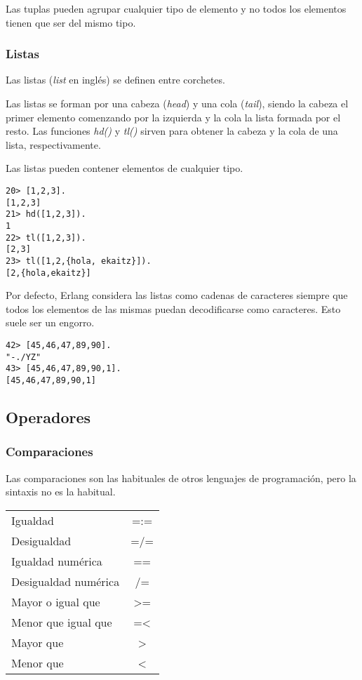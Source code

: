 Las tuplas pueden agrupar cualquier tipo de elemento y no todos los elementos tienen que ser del mismo tipo.

\subsubsection{Listas}

Las listas (\textit{list} en inglés) se definen entre corchetes.

Las listas se forman por una cabeza (\textit{head}) y una cola (\textit{tail}), siendo la cabeza el primer
elemento comenzando por la izquierda y la cola la lista formada por el resto. Las funciones \textit{hd()} y
\textit{tl()} sirven para obtener la cabeza y la cola de una lista, respectivamente.

Las listas pueden contener elementos de cualquier tipo.

\begin{lstlisting}
20> [1,2,3].
[1,2,3]
21> hd([1,2,3]).
1
22> tl([1,2,3]).
[2,3]
23> tl([1,2,{hola, ekaitz}]).
[2,{hola,ekaitz}]
\end{lstlisting}

Por defecto, Erlang considera las listas como cadenas de caracteres siempre que todos los elementos de las
mismas puedan decodificarse como caracteres. Esto suele ser un engorro.
\begin{lstlisting}
42> [45,46,47,89,90].
"-./YZ"
43> [45,46,47,89,90,1].
[45,46,47,89,90,1]
\end{lstlisting}



\subsection{Operadores}

\subsubsection{Comparaciones}

Las comparaciones son las habituales de otros lenguajes de programación, pero la sintaxis no es la habitual.

\begin{table}[ht]
\centering
\begin{tabular}{|l|c|}
Igualdad             & =:=           \\
Desigualdad          & =/=           \\
Igualdad numérica    & ==            \\
Desigualdad numérica & /=            \\
Mayor o igual que    & \textgreater= \\
Menor que igual que  & =\textless    \\
Mayor que	     & \textgreater  \\
Menor que	     & \textless     \\
\end{tabular}
\end{table}

